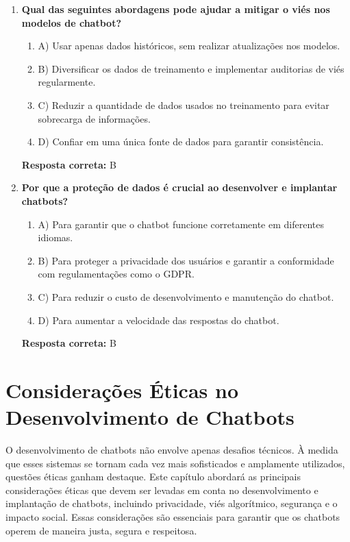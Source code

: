\documentclass[14pt,a4paper,oneside]{book}
\begin{document}
\begin{enumerate}
	\item \textbf{Qual das seguintes abordagens pode ajudar a mitigar o viés nos modelos de chatbot?}
	\begin{enumerate}[label=\alph*)]
		\item A) Usar apenas dados históricos, sem realizar atualizações nos modelos.
		\item B) Diversificar os dados de treinamento e implementar auditorias de viés regularmente.
		\item C) Reduzir a quantidade de dados usados no treinamento para evitar sobrecarga de informações.
		\item D) Confiar em uma única fonte de dados para garantir consistência.
	\end{enumerate}
	\vspace{5mm}
	\textbf{Resposta correta:} B
	
	\item \textbf{Por que a proteção de dados é crucial ao desenvolver e implantar chatbots?}
	\begin{enumerate}[label=\alph*)]
		\item A) Para garantir que o chatbot funcione corretamente em diferentes idiomas.
		\item B) Para proteger a privacidade dos usuários e garantir a conformidade com regulamentações como o GDPR.
		\item C) Para reduzir o custo de desenvolvimento e manutenção do chatbot.
		\item D) Para aumentar a velocidade das respostas do chatbot.
	\end{enumerate}
	\vspace{5mm}
	\textbf{Resposta correta:} B
	
\end{enumerate}


\chapter{Considerações Éticas no Desenvolvimento de Chatbots}

O desenvolvimento de chatbots não envolve apenas desafios técnicos. À medida que esses sistemas se tornam cada vez mais sofisticados e amplamente utilizados, questões éticas ganham destaque. Este capítulo abordará as principais considerações éticas que devem ser levadas em conta no desenvolvimento e implantação de chatbots, incluindo privacidade, viés algorítmico, segurança e o impacto social. Essas considerações são essenciais para garantir que os chatbots operem de maneira justa, segura e respeitosa.
\end{document}
